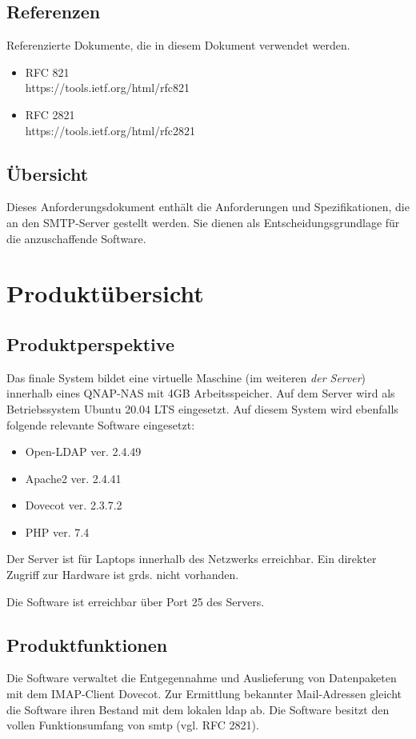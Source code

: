 \subsection{Referenzen}
Referenzierte Dokumente, die in diesem Dokument verwendet werden.
\begin{itemize}
	\citereset
	\item RFC 821 \\
	https://tools.ietf.org/html/rfc821 
	\item RFC 2821\\
	https://tools.ietf.org/html/rfc2821
	\citereset
\end{itemize}



\subsection{Übersicht}
Dieses Anforderungsdokument enthält die Anforderungen und Spezifikationen, die an den SMTP-Server gestellt werden.
Sie dienen als Entscheidungsgrundlage für die anzuschaffende Software.

\section{Produktübersicht}
\subsection{Produktperspektive}
Das finale System bildet eine virtuelle Maschine (im weiteren \textit{der Server}) innerhalb eines QNAP-NAS mit 4GB Arbeitsspeicher.
Auf dem Server wird als Betriebssystem Ubuntu 20.04 LTS eingesetzt. Auf diesem System wird ebenfalls folgende relevante Software eingesetzt:
\begin{itemize}
	\item Open-LDAP ver. 2.4.49
	\item Apache2 ver. 2.4.41
	\item Dovecot ver. 2.3.7.2
	\item PHP ver. 7.4
\end{itemize} 
Der Server ist für Laptops innerhalb des Netzwerks erreichbar. Ein direkter Zugriff zur Hardware ist grds. nicht vorhanden.

Die Software ist erreichbar über Port 25 des Servers.  

\subsection{Produktfunktionen}
Die Software verwaltet die Entgegennahme und Auslieferung von Datenpaketen mit dem IMAP-Client Dovecot.
Zur Ermittlung bekannter Mail-Adressen gleicht die Software ihren Bestand mit dem lokalen \ac{ldap} ab.
Die Software besitzt den vollen Funktionsumfang von \ac{smtp} (vgl. RFC 2821).

